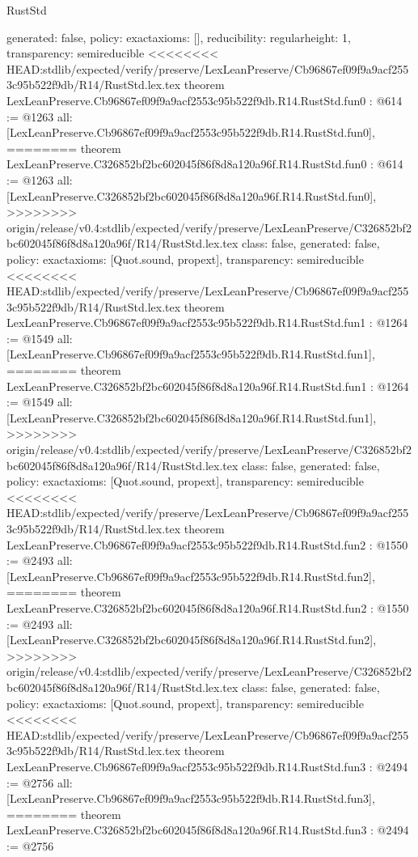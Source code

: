 \begin{lexlean}{RustStd}
\begin{coremodule}
{\begin{coremodule}
{{{  generated: false,
  policy: exact{axioms: []},
  reducibility: regular{height: 1},
  transparency: semireducible
}
<<<<<<<< HEAD:stdlib/expected/verify/preserve/LexLeanPreserve/Cb96867ef09f9a9acf2553c95b522f9db/R14/RustStd.lex.tex
theorem LexLeanPreserve.Cb96867ef09f9a9acf2553c95b522f9db.R14.RustStd.fun0 : @614 := @1263 {
  all: [LexLeanPreserve.Cb96867ef09f9a9acf2553c95b522f9db.R14.RustStd.fun0],
========
theorem LexLeanPreserve.C326852bf2bc602045f86f8d8a120a96f.R14.RustStd.fun0 : @614 := @1263 {
  all: [LexLeanPreserve.C326852bf2bc602045f86f8d8a120a96f.R14.RustStd.fun0],
>>>>>>>> origin/release/v0.4:stdlib/expected/verify/preserve/LexLeanPreserve/C326852bf2bc602045f86f8d8a120a96f/R14/RustStd.lex.tex
  class: false,
  generated: false,
  policy: exact{axioms: [Quot.sound, propext]},
  transparency: semireducible
}
<<<<<<<< HEAD:stdlib/expected/verify/preserve/LexLeanPreserve/Cb96867ef09f9a9acf2553c95b522f9db/R14/RustStd.lex.tex
theorem LexLeanPreserve.Cb96867ef09f9a9acf2553c95b522f9db.R14.RustStd.fun1 : @1264 := @1549 {
  all: [LexLeanPreserve.Cb96867ef09f9a9acf2553c95b522f9db.R14.RustStd.fun1],
========
theorem LexLeanPreserve.C326852bf2bc602045f86f8d8a120a96f.R14.RustStd.fun1 : @1264 := @1549 {
  all: [LexLeanPreserve.C326852bf2bc602045f86f8d8a120a96f.R14.RustStd.fun1],
>>>>>>>> origin/release/v0.4:stdlib/expected/verify/preserve/LexLeanPreserve/C326852bf2bc602045f86f8d8a120a96f/R14/RustStd.lex.tex
  class: false,
  generated: false,
  policy: exact{axioms: [Quot.sound, propext]},
  transparency: semireducible
}
<<<<<<<< HEAD:stdlib/expected/verify/preserve/LexLeanPreserve/Cb96867ef09f9a9acf2553c95b522f9db/R14/RustStd.lex.tex
theorem LexLeanPreserve.Cb96867ef09f9a9acf2553c95b522f9db.R14.RustStd.fun2 : @1550 := @2493 {
  all: [LexLeanPreserve.Cb96867ef09f9a9acf2553c95b522f9db.R14.RustStd.fun2],
========
theorem LexLeanPreserve.C326852bf2bc602045f86f8d8a120a96f.R14.RustStd.fun2 : @1550 := @2493 {
  all: [LexLeanPreserve.C326852bf2bc602045f86f8d8a120a96f.R14.RustStd.fun2],
>>>>>>>> origin/release/v0.4:stdlib/expected/verify/preserve/LexLeanPreserve/C326852bf2bc602045f86f8d8a120a96f/R14/RustStd.lex.tex
  class: false,
  generated: false,
  policy: exact{axioms: [Quot.sound, propext]},
  transparency: semireducible
}
<<<<<<<< HEAD:stdlib/expected/verify/preserve/LexLeanPreserve/Cb96867ef09f9a9acf2553c95b522f9db/R14/RustStd.lex.tex
theorem LexLeanPreserve.Cb96867ef09f9a9acf2553c95b522f9db.R14.RustStd.fun3 : @2494 := @2756 {
  all: [LexLeanPreserve.Cb96867ef09f9a9acf2553c95b522f9db.R14.RustStd.fun3],
========
theorem LexLeanPreserve.C326852bf2bc602045f86f8d8a120a96f.R14.RustStd.fun3 : @2494 := @2756 {
}}}}}}}
\end{coremodule}}
\end{coremodule}
\end{lexlean}
